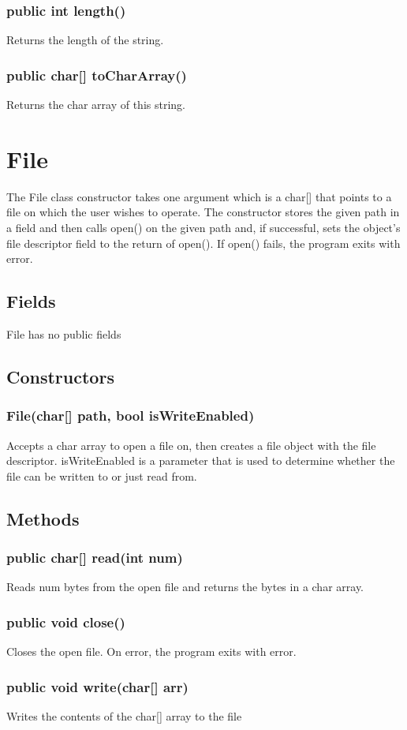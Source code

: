 \begin{homeworkProblem}
	\subsubsection{public int length()}
	Returns the length of the string.
	\subsubsection{public char[] toCharArray()}
	Returns the char array of this string.

	\section{File}
	The File class constructor takes one argument which is a char[] that points to a file on which the user wishes to operate. The constructor stores the given path in a field and then calls open() on the given path and, if successful, sets the object’s file descriptor field to the return of open(). If open() fails, the program exits with error.
	\subsection{Fields}
	File has no public fields

	\subsection{Constructors}
	\subsubsection{File(char[] path, bool isWriteEnabled)}
	Accepts a char array to open a file on, then creates a file object with the file descriptor. isWriteEnabled is a parameter that is used to determine whether the file can be written to or just read from.

	\subsection{Methods}
	\subsubsection{public char[] read(int num)}
	Reads num bytes from the open file and returns the bytes in a char array.
	\subsubsection{public void close()}
	Closes the open file. On error, the program exits with error.
	\subsubsection{public void write(char[] arr)}
	Writes the contents of the char[] array to the file

\end{homeworkProblem}
